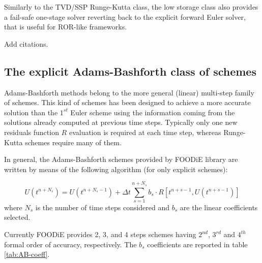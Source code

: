 \documentclass[pdftex,preprint,3p,times,numbers]{elsarticle}
\begin{document}
Similarly to the TVD/SSP Runge-Kutta class, the low storage class also provides a fail-safe one-stage solver reverting back to the explicit forward Euler solver, that is useful for ROR-like frameworks.

{\color{red} Add citations.}

\subsection{The explicit Adams-Bashforth class of schemes}

Adams-Bashforth methods belong to the more general (linear) multi-step family of schemes. This kind of schemes has been designed to achieve a more accurate solution than the $1^{st}$ Euler scheme using the information coming from the solutions already computed at previous time steps. Typically only one new residuals function $R$ evaluation is required at each time step, whereas Runge-Kutta schemes require many of them.

In general, the Adams-Bashforth schemes provided by FOODiE library are written by means of the following algorithm (for only explicit schemes):

\begin{equation}
U\left(t^{n+N_s}\right) = U\left(t^{n+N_s-1}\right) +\Delta t \sum_{s=1}^{n+N_s}{ b_s \cdot R\left[t^{n+s-1}, U\left(t^{n+s-1}\right)\right]}
\label{eq:AB}
\end{equation}
where $N_s$ is the number of time steps considered and $b_s$ are the linear coefficients selected.

Currently FOODiE provides 2, 3, and 4 steps schemes having $2^{nd}$, $3^{rd}$ and $4^{th}$ formal order of accuracy, respectively. The $b_s$ coefficients are reported in table \ref{tab:AB-coeff}.

\begin{table}[!ht]
  \centering
  \caption{Explicit Adams-Bashforth coefficients\label{tab:AB-coeff}}
\end{table}
\end{document}
